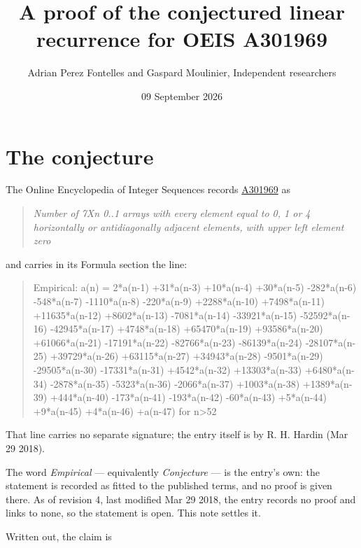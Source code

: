 \documentclass[11pt]{article}
\title{A proof of the conjectured linear recurrence for OEIS A301969}
\author{Adrian Perez Fontelles and Gaspard Moulinier, Independent researchers}
\date{09 September 2026}
\theoremstyle{definition}
\begin{document}
\maketitle
\section{The conjecture}

The Online Encyclopedia of Integer Sequences records \href{https://oeis.org/A301969}{A301969} as

\begin{quote}\itshape Number of 7Xn 0..1 arrays with every element equal to 0, 1 or 4 horizontally or antidiagonally adjacent elements, with upper left element zero\end{quote}

and carries in its Formula section the line:

\begin{quote}\ttfamily Empirical: a(n) = 2*a(n-1) +31*a(n-3) +10*a(n-4) +30*a(n-5) -282*a(n-6) -548*a(n-7) -1110*a(n-8) -220*a(n-9) +2288*a(n-10) +7498*a(n-11) +11635*a(n-12) +8602*a(n-13) -7081*a(n-14) -33921*a(n-15) -52592*a(n-16) -42945*a(n-17) +4748*a(n-18) +65470*a(n-19) +93586*a(n-20) +61066*a(n-21) -17191*a(n-22) -82766*a(n-23) -86139*a(n-24) -28107*a(n-25) +39729*a(n-26) +63115*a(n-27) +34943*a(n-28) -9501*a(n-29) -29505*a(n-30) -17331*a(n-31) +4542*a(n-32) +13303*a(n-33) +6480*a(n-34) -2878*a(n-35) -5323*a(n-36) -2066*a(n-37) +1003*a(n-38) +1389*a(n-39) +444*a(n-40) -173*a(n-41) -193*a(n-42) -60*a(n-43) +5*a(n-44) +9*a(n-45) +4*a(n-46) +a(n-47) for n>52\end{quote}

That line carries no separate signature; the entry itself is by R. H. Hardin (Mar 29 2018).

The word {\itshape Empirical} --- equivalently {\itshape Conjecture} --- is the entry's own: the statement is recorded as fitted to the published terms, and no proof is given there. As of revision 4, last modified Mar 29 2018, the entry records no proof and links to none, so the statement is open. This note settles it.

Written out, the claim is
\end{document}
